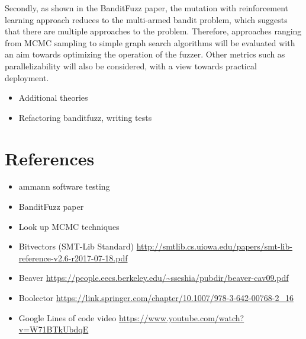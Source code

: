 \documentclass[article,11pt]{article}
\begin{document}
Secondly, as shown in the BanditFuzz paper\cite{bandit}, the mutation with reinforcement learning approach reduces to the multi-armed bandit problem, which suggests that there are multiple approaches to the problem. Therefore, approaches ranging from MCMC sampling to simple graph search algorithms will be evaluated with an aim towards optimizing the operation of the fuzzer. Other metrics such as parallelizability will also be considered, with a view towards practical deployment.\\

\begin{itemize}
\item Additional theories\\
\item Refactoring banditfuzz, writing tests\\
\end{itemize}

\section*{References}
\label{sec:org9612120}
\begin{itemize}
\item ammann software testing\\
\item BanditFuzz paper\\
\item Look up MCMC techniques\\
\item Bitvectors (SMT-Lib Standard) \url{http://smtlib.cs.uiowa.edu/papers/smt-lib-reference-v2.6-r2017-07-18.pdf}\\
\item Beaver \url{https://people.eecs.berkeley.edu/\~sseshia/pubdir/beaver-cav09.pdf}\\
\item Boolector \url{https://link.springer.com/chapter/10.1007/978-3-642-00768-2\_16}\\
\item Google Lines of code video \url{https://www.youtube.com/watch?v=W71BTkUbdqE}\\
\end{itemize}
\end{document}
